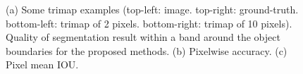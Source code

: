 \begin{figure}[!tbp]
\centering
{}
  \caption{(a) Some trimap examples (top-left: image. top-right: ground-truth. bottom-left: trimap of 2 pixels. bottom-right: trimap of 10 pixels). Quality of segmentation result within a band around the object boundaries for the proposed methods. (b) Pixelwise accuracy. (c) Pixel mean IOU. 
    }  
  \label{fig:IOUBoundary}
\end{figure}


